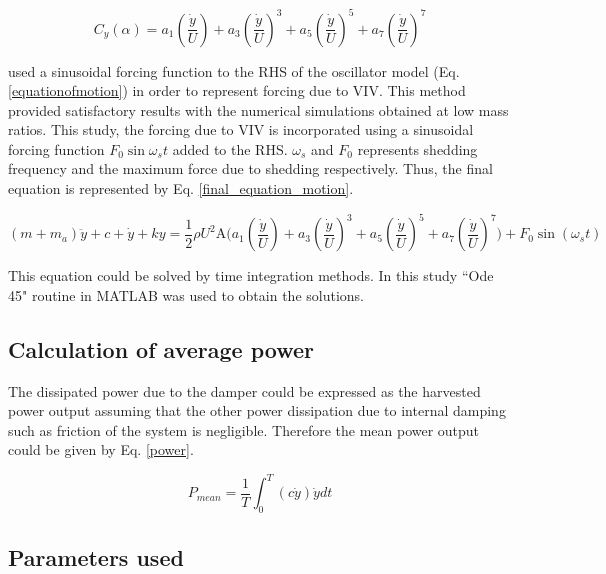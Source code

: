 \begin{equation}
\label{cy ploynomial}
C_y(\alpha)=a_1\left(\frac{\dot{y}}{U}\right)+a_3\left(\frac{\dot{y}}{U}\right)^3+a_5\left(\frac{\dot{y}}{U}\right)^5+a_7\left(\frac{\dot{y}}{U}\right)^7
\end{equation}


\cite{Joly2012} used a sinusoidal forcing function to the RHS of the oscillator model (Eq. \eqref{equationofmotion}) in order to represent forcing due to VIV. This method provided satisfactory results with the numerical simulations obtained at low mass ratios. This study, the forcing due to VIV is incorporated using a sinusoidal forcing function $F_0\sin{\omega_{s}t}$ added to the RHS. $\omega_{s}$ and $F_0$ represents shedding frequency and the maximum force due to shedding respectively. Thus, the final equation is represented by Eq. \eqref{final_equation_motion}.    

\begin{equation}
\label{final_equation_motion}
(m{+}m_a)\ddot{y}{+}c{+}\dot{y}{+}ky{=}\frac{1}{2}\rho U^2 \text{A} \Bigg(a_1\left(\frac{\dot{y}}{U}\right){+}a_3\left(\frac{\dot{y}}{U}\right)^3{+}a_5\left(\frac{\dot{y}}{U}\right)^5{+}a_7\left(\frac{\dot{y}}{U}\right)^7 \Bigg){+} F_0\sin{(\omega_s t)}
\end{equation}

This equation could be solved by time integration methods. In  this study  ``Ode 45" routine in MATLAB was used to obtain the solutions.

\subsection{Calculation of average power}

 The dissipated power due to the damper could be expressed as the harvested power output assuming that the other  power dissipation due to internal damping such as friction of the system is negligible. Therefore the mean power output could be given by Eq. \eqref{power}. 
  
 
 \begin{equation}
 \label{power}
P_{mean}=\frac{1}{T}\int_{0}^{T}(c\dot{y})\dot{y} dt
 \end{equation}
 
\subsection{Parameters used} 
 

